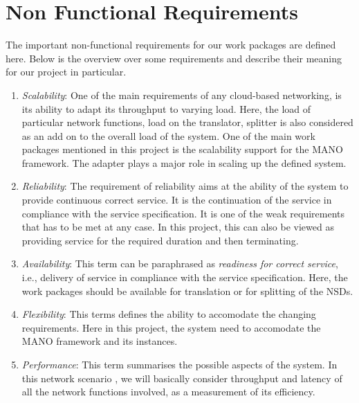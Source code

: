 \chapter{Non Functional Requirements}
\label{ch:Non Functional Requirements}

The important non-functional requirements for our work packages are defined here. Below is the overview over some requirements and describe their meaning for our project in particular.


\begin{enumerate}
	\item \textit {Scalability}: One of the main requirements of any cloud-based networking, is its ability to adapt its throughput to varying load. Here, the load of particular network functions, load on the translator, splitter is also considered as an add on to the overall load of the system. One of the main work packages mentioned in this project is the scalability support for the MANO framework. The adapter plays a major role in scaling up the defined system.
	
	\item \textit {Reliability}: The requirement of reliability aims at the ability of the system to provide continuous correct service. It is the continuation of the service in compliance with the service specification. It is one of the weak requirements that has to be met at any case. In this project, this can also be viewed as providing service for the required duration and then terminating.
	
	\item \textit {Availability}: This term can be paraphrased as \textit {readiness for correct service}, i.e., delivery of service in compliance with the service specification. Here, the work packages should be available for translation or for splitting of the NSDs.
	
	\item \textit{Flexibility}: This terms defines the ability to accomodate the changing requirements. Here in this project, the system need to accomodate the MANO framework and its instances. 
	
	\item \textit{Performance}: This term summarises the possible aspects of the system. In this network scenario , we will basically consider throughput and latency of all the network functions involved, as a measurement of its efficiency. 
	
	
	
\end{enumerate}

